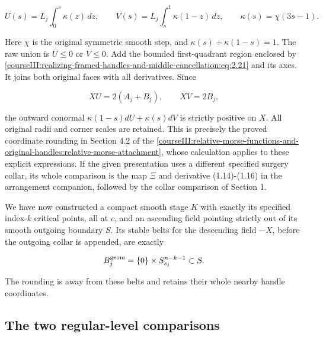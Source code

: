 \begin{equation}
U(s)=L_j\int_0^s\kappa(z)\,dz,\qquad
 V(s)=L_j\int_s^1\kappa(1-z)\,dz,\qquad
 \kappa(s)=\chi(3s-1).
 \label{courseIII:realizing-framed-handles-and-middle-cancellation:eq:2.21}
\end{equation}

Here \(\chi\) is the original symmetric smooth step, and
\(\kappa(s)+\kappa(1-s)=1\). The raw union is \(U\leq0\) or \(V\leq0\). Add the bounded first-quadrant region enclosed by \eqref{courseIII:realizing-framed-handles-and-middle-cancellation:eq:2.21} and its axes. It joins both original faces with all derivatives. Since

\begin{equation}
XU=2(A_j+B_j),\qquad XV=2B_j,
 \label{courseIII:realizing-framed-handles-and-middle-cancellation:eq:2.22}
\end{equation}

the outward conormal \(\kappa(1-s)dU+\kappa(s)dV\) is strictly positive on \(X\). All original radii and corner scales are retained. This is precisely the proved coordinate rounding in Section 4.2 of the \cref{courseIII:relative-morse-functions-and-original-handles:relative-morse-attachment}, whose calculation applies to these explicit expressions. If the given presentation uses a different specified surgery collar, its whole comparison is the map \(\Xi\) and derivative (1.14)-(1.16) in the arrangement companion, followed by the collar comparison of Section 1.

We have now constructed a compact smooth stage \(K\) with exactly its specified index-\(k\) critical points, all at \(c\), and an ascending field pointing strictly out of its smooth outgoing boundary \(S\). Its stable belts for the descending field \(-X\), before the outgoing collar is appended, are exactly

\begin{equation}
B_j^{\rm geom}=\{0\}\times S^{n-k-1}_{s_j}\subset S.
 \label{courseIII:realizing-framed-handles-and-middle-cancellation:eq:2.23}
\end{equation}

The rounding is away from these belts and retains their whole nearby handle coordinates.

\subsection{The two regular-level comparisons}
\label{courseIII:realizing-framed-handles-and-middle-cancellation:middle-level-comparisons}

